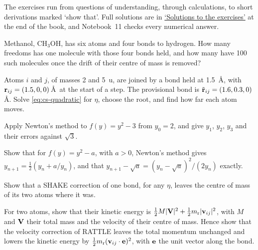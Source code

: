 \label{sec:cs-exercises}

The exercises run from questions of understanding, through calculations,
to short derivations marked `show that'. Full solutions are in
\hyperref[sec:cs-solutions]{`Solutions to the exercises'} at the end of
the book, and Notebook~11 checks every numerical answer.

\begin{exercise}
\label{ex:cs-freedoms}
Methanol, CH$_3$OH, has six atoms and four bonds to hydrogen. How many
freedoms has one molecule with those four bonds held, and how many have
100 such molecules once the drift of their centre of mass is removed?
\end{exercise}

\begin{exercise}
\label{ex:cs-one-bond}
Atoms $i$ and $j$, of masses 2 and \SI{5}{\amu}, are joined by a bond held
at \SI{1.5}{\angstrom}, with $\bm{\mathrm{r}}_{ij} = (1.5, 0, 0)$\,\AA\ at the start
of a step. The provisional bond is $\tilde{\bm{\mathrm{r}}}_{ij} = (1.6, 0.3,
0)$\,\AA. Solve \cref{eq:cs-quadratic} for $\eta$, choose the root, and
find how far each atom moves.
\end{exercise}

\begin{exercise}
\label{ex:cs-newton}
Apply Newton's method to $f(y) = y^2 - 3$ from $y_0 = 2$, and give $y_1$,
$y_2$, $y_3$ and their errors against $\sqrt3$.
\end{exercise}

\begin{exercise}
\label{ex:cs-newton-error}
Show that for $f(y) = y^2 - a$, with $a > 0$, Newton's method gives
$y_{n+1} = \frac12(y_n + a/y_n)$, and that $y_{n+1} - \sqrt a = (y_n -
\sqrt a)^2/(2y_n)$ exactly.
\end{exercise}

\begin{exercise}
\label{ex:cs-centre}
Show that a SHAKE correction of one bond, for any $\eta$, leaves the
centre of mass of its two atoms where it was.
\end{exercise}

\begin{exercise}
\label{ex:cs-kinetic}
For two atoms, show that their kinetic energy is $\frac12M\lvert\bm{\mathrm{V}}
\rvert^2 + \frac12m_{\mathrm r}\lvert\bm{\mathrm{v}}_{ij}\rvert^2$, with $M$ and
$\bm{\mathrm{V}}$ their total mass and the velocity of their centre of mass. Hence
show that the velocity correction of RATTLE leaves the total momentum
unchanged and lowers the kinetic energy by $\frac12m_{\mathrm r}
(\bm{\mathrm{v}}_{ij}\cdot\bm{\mathrm{e}})^2$, with $\bm{\mathrm{e}}$ the unit vector along the
bond.
\end{exercise}

